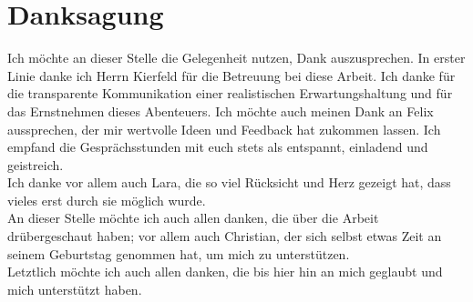 \documentclass{solutionclass}
\begin{document}
\thispagestyle{fancyplain}
\fancyhead{}
\renewcommand{\headrulewidth}{0pt}
\clearpage
\pagestyle{fancy} %
\printbibliography[heading=bibintoc, title=Literatur]

\printbibliography[heading=bibintoc, title=Bildverzeichnis, keyword=bildverzeichnis]
\newpage
\section*{Danksagung}

Ich möchte an dieser Stelle die Gelegenheit nutzen, Dank auszusprechen. In erster Linie danke ich Herrn Kierfeld für die Betreuung bei diese Arbeit. Ich danke für die transparente Kommunikation einer realistischen Erwartungshaltung und für das Ernstnehmen dieses Abenteuers. Ich möchte auch meinen Dank an Felix aussprechen, der mir wertvolle Ideen und Feedback hat zukommen lassen. Ich empfand die Gesprächsstunden mit euch stets als entspannt, einladend und geistreich.\\

Ich danke vor allem auch Lara, die so viel Rücksicht und Herz gezeigt hat, dass vieles erst durch sie möglich wurde.\\

An dieser Stelle möchte ich auch allen danken, die über die Arbeit drübergeschaut haben; vor allem auch Christian, der sich selbst etwas Zeit an seinem Geburtstag genommen hat, um mich zu unterstützen.\\

Letztlich möchte ich auch allen danken, die bis hier hin an mich geglaubt und mich unterstützt haben.
\newpage

\end{document}
